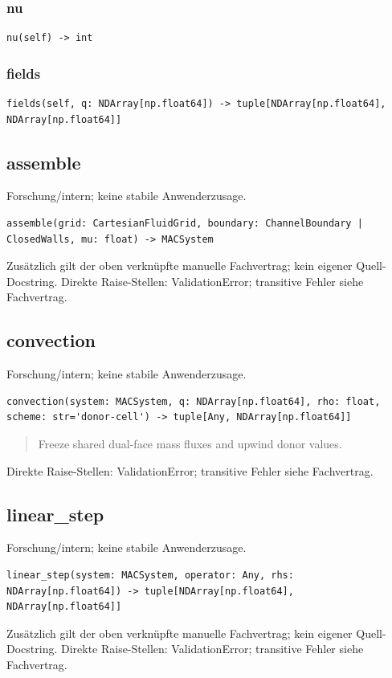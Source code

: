 \subsubsection*{nu}
\begin{lstlisting}
nu(self) -> int
\end{lstlisting}
\subsubsection*{fields}
\begin{lstlisting}
fields(self, q: NDArray[np.float64]) -> tuple[NDArray[np.float64], NDArray[np.float64]]
\end{lstlisting}
\subsection{assemble}
Forschung/intern; keine stabile Anwenderzusage.
\begin{lstlisting}
assemble(grid: CartesianFluidGrid, boundary: ChannelBoundary | ClosedWalls, mu: float) -> MACSystem
\end{lstlisting}
Zusätzlich gilt der oben verknüpfte manuelle Fachvertrag; kein eigener Quell-Docstring.
Direkte Raise-Stellen: ValidationError; transitive Fehler siehe Fachvertrag.
\subsection{convection}
Forschung/intern; keine stabile Anwenderzusage.
\begin{lstlisting}
convection(system: MACSystem, q: NDArray[np.float64], rho: float, scheme: str='donor-cell') -> tuple[Any, NDArray[np.float64]]
\end{lstlisting}
\begin{quote}
Freeze shared dual-face mass fluxes and upwind donor values.
\end{quote}
Direkte Raise-Stellen: ValidationError; transitive Fehler siehe Fachvertrag.
\subsection{linear\_step}
Forschung/intern; keine stabile Anwenderzusage.
\begin{lstlisting}
linear_step(system: MACSystem, operator: Any, rhs: NDArray[np.float64]) -> tuple[NDArray[np.float64], NDArray[np.float64]]
\end{lstlisting}
Zusätzlich gilt der oben verknüpfte manuelle Fachvertrag; kein eigener Quell-Docstring.
Direkte Raise-Stellen: ValidationError; transitive Fehler siehe Fachvertrag.
